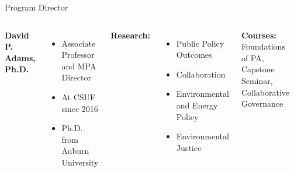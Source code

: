 \documentclass[10pt]{beamer}
\newlength{\imageheight}
\begin{document}
    \begin{frame}{Program Director}
    \begin{columns}[T]
    \textbf{David P. Adams, Ph.D.}
    \begin{itemize}
    \item Associate Professor and MPA Director
    \item At CSUF since 2016
    \item Ph.D. from Auburn University
    \end{itemize}
    
    \textbf{Research:}
    \begin{itemize}
    \item Public Policy Outcomes
    \item Collaboration
    \item Environmental and Energy Policy
    \item Environmental Justice
    \end{itemize}
    
    \textbf{Courses:} Foundations of PA, Capstone Seminar, Collaborative Governance
    
    \vspace*{0.5cm} %
    \includegraphics[height=\imageheight]{images/adams.jpg}
    \end{columns}
    \end{frame}
        
\end{document}
